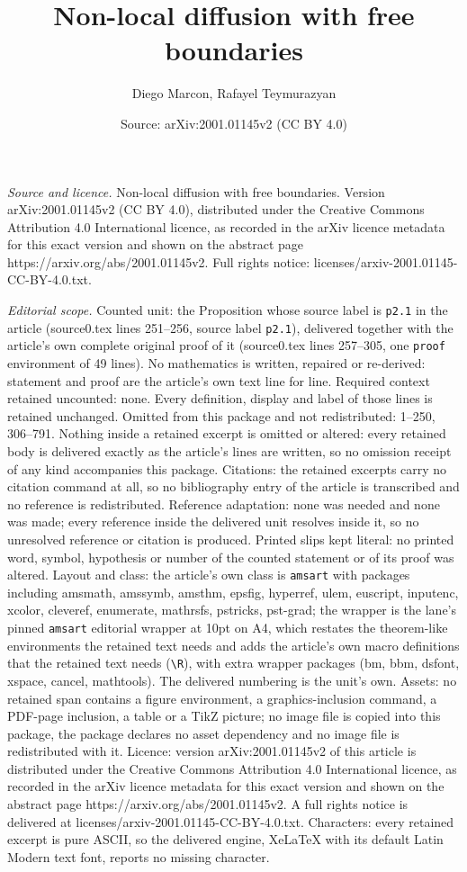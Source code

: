 \documentclass[10pt,a4paper]{amsart}
\title[Non-local diffusion with free boundaries]{Non-local diffusion with free boundaries}
\author{Diego Marcon, Rafayel Teymurazyan}
\date{Source: arXiv:2001.01145v2 (CC BY 4.0)}
\begin{document}
\maketitle

\noindent\emph{Source and licence.} Non-local diffusion with free boundaries. Version arXiv:2001.01145v2 (CC BY 4.0), distributed under the Creative Commons Attribution 4.0 International licence, as recorded in the arXiv licence metadata for this exact version and shown on the abstract page https://arxiv.org/abs/2001.01145v2. Full rights notice: licenses/arxiv-2001.01145-CC-BY-4.0.txt.\par\smallskip

\noindent\textit{Editorial scope.} Counted unit: the Proposition whose source label is \texttt{p2.1} in the article (source0.tex lines 251--256, source label \texttt{p2.1}), delivered together with the article's own complete original proof of it (source0.tex lines 257--305, one \texttt{proof} environment of 49 lines). No mathematics is written, repaired or re-derived: statement and proof are the article's own text line for line. Required context retained uncounted: none. Every definition, display and label of those lines is retained unchanged. Omitted from this package and not redistributed: 1--250, 306--791. Nothing inside a retained excerpt is omitted or altered: every retained body is delivered exactly as the article's lines are written, so no omission receipt of any kind accompanies this package. Citations: the retained excerpts carry no citation command at all, so no bibliography entry of the article is transcribed and no reference is redistributed. Reference adaptation: none was needed and none was made; every reference inside the delivered unit resolves inside it, so no unresolved reference or citation is produced. Printed slips kept literal: no printed word, symbol, hypothesis or number of the counted statement or of its proof was altered. Layout and class: the article's own class is \texttt{amsart} with packages including amsmath, amssymb, amsthm, epsfig, hyperref, ulem, euscript, inputenc, xcolor, cleveref, enumerate, mathrsfs, pstricks, pst-grad; the wrapper is the lane's pinned \texttt{amsart} editorial wrapper at 10pt on A4, which restates the theorem-like environments the retained text needs and adds the article's own macro definitions that the retained text needs (\texttt{\textbackslash R}), with extra wrapper packages (bm, bbm, dsfont, xspace, cancel, mathtools). The delivered numbering is the unit's own. Assets: no retained span contains a figure environment, a graphics-inclusion command, a PDF-page inclusion, a table or a TikZ picture; no image file is copied into this package, the package declares no asset dependency and no image file is redistributed with it. Licence: version arXiv:2001.01145v2 of this article is distributed under the Creative Commons Attribution 4.0 International licence, as recorded in the arXiv licence metadata for this exact version and shown on the abstract page https://arxiv.org/abs/2001.01145v2. A full rights notice is delivered at licenses/arxiv-2001.01145-CC-BY-4.0.txt. Characters: every retained excerpt is pure ASCII, so the delivered engine, XeLaTeX with its default Latin Modern text font, reports no missing character.
\end{document}
